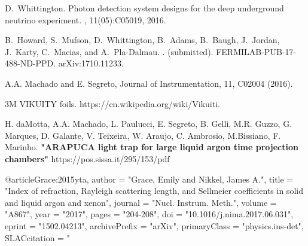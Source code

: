 



\begin{thebibliography}{1}
D.~Whittington.
\newblock Photon detection system designs for the deep underground neutrino
  experiment.
, 11(05):C05019, 2016.

B.~Howard, S.~Mufson, D.~Whittington, B.~Adams, B.~Baugh, J.~Jordan, J.~Karty,
  C.~Macias, and A.~Pla-Dalmau.
.
 (submitted).
\newblock FERMILAB-PUB-17-488-ND-PPD.
\newblock arXiv:1710.11233.

\end{thebibliography}





\begin{thebibliography}{99}
\footnotesize{

 A.A. Machado and E. Segreto, Journal of Instrumentation, 11, C02004 (2016).

	3M VIKUITY foils. https://en.wikipedia.org/wiki/Vikuiti.
    
 H. daMotta, A.A. Machado, L. Paulucci, E. Segreto, B. Gelli, M.R. Guzzo, G. Marques, D. Galante, V. Teixeira, W. Araujo, C. Ambrosio, M.Bissiano, F. Marinho. {\bf"ARAPUCA light trap for large liquid argon time projection chambers"}
    https://pos.sissa.it/295/153/pdf

}
\end{thebibliography}




@article{Grace:2015yta,
      author         = "Grace, Emily and Nikkel, James A.",
      title          = "{Index of refraction, Rayleigh scattering length, and
                        Sellmeier coefficients in solid and liquid argon and
                        xenon}",
      journal        = "Nucl. Instrum. Meth.",
      volume         = "A867",
      year           = "2017",
      pages          = "204-208",
      doi            = "10.1016/j.nima.2017.06.031",
      eprint         = "1502.04213",
      archivePrefix  = "arXiv",
      primaryClass   = "physics.ins-det",
      SLACcitation   = "%
}